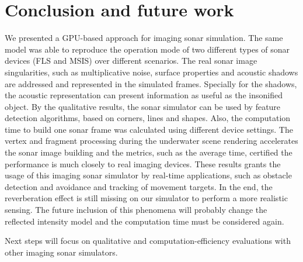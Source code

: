 \documentclass[final,5p,times]{elsarticle}
\begin{document}

\section{Conclusion and future work}
\label{conclusion}

We presented a GPU-based approach for imaging sonar simulation. The same model was able to reproduce the operation mode of two different types of sonar devices (FLS and MSIS) over different scenarios. The real sonar image singularities, such as multiplicative noise, surface properties and acoustic shadows are addressed and represented in the simulated frames. Specially for the shadows, the acoustic representation can present information as useful as the insonified object. By the qualitative results, the sonar simulator can be used by feature detection algorithms, based on corners, lines and shapes. Also, the computation time to build one sonar frame was calculated using different device settings. The vertex and fragment processing during the underwater scene rendering accelerates the sonar image building and the metrics, such as the average time, certified the performance is much closely to real imaging devices. These results grants the usage of this imaging sonar simulator by real-time applications, such as obstacle detection and avoidance and tracking of movement targets. In the end, the reverberation effect is still missing on our simulator to perform a more realistic sensing. The future inclusion of this phenomena will probably change the reflected intensity model and the computation time must be considered again.

Next steps will focus on qualitative and computation-efficiency evaluations with other imaging sonar simulators.









\end{document}
